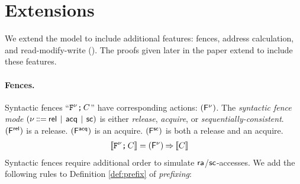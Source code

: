 \section{Extensions}
\label{sec:variants}

We extend the model to include additional
features: fences, address calculation, and read-modify-write (\RMW). The
proofs given later in the paper extend to include these features.  

\paragraph{Fences.}

Syntactic fences
``$\texttt{F}^{\nu} \texttt{;}\,\allowbreak C$'' have corresponding  actions: $(\smash{\mathsf{F}^{\nu}})$.  The \emph{syntactic fence mode}
$(\fmode \!\!\BNFDEF\!\! \modeREL \!\BNFSEP\! \modeACQ \!\BNFSEP\! \modeSC)$
is either \emph{release}, \emph{acquire}, or \emph{sequentially-consistent}.
$(\smash{\mathsf{F}^{{\mathsf{rel}}}})$ is a release. $(\smash{\mathsf{F}^{{\mathsf{acq}}}})$ is an acquire.
$(\smash{\mathsf{F}^{{\mathsf{sc}}}})$ is both a release and an acquire.
\begin{align*}
  \llbracket\texttt{F}^{\nu}\texttt{;}\,\allowbreak C\rrbracket & =
  (\smash{\mathsf{F}^{\nu}}) \mathbin\Rightarrow \llbracket C\rrbracket
\end{align*}
Syntactic fences require additional order to simulate ${\mathsf{ra}}$/${\mathsf{sc}}$-accesses.
We add the following rules 
to Definition \ref{def:prefix} of \emph{prefixing}:
